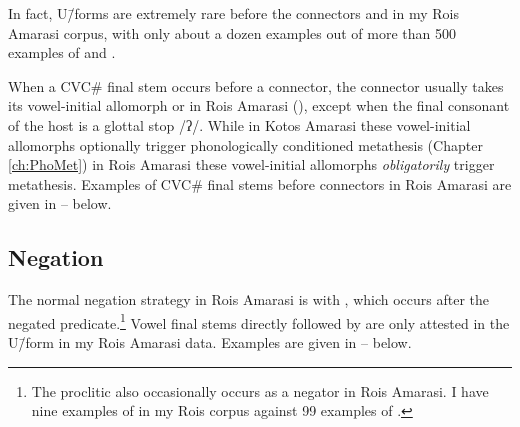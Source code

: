 In fact, U\=/forms are extremely rare before the connectors
 and  in my Ro{\Q}is Amarasi corpus,
with only about a dozen examples out of more than 500 examples
of  and .

When a CVC{\#} final stem occurs before a connector,
the connector usually takes its vowel-initial
allomorph  or  in Ro{\Q}is Amarasi (),
except when the final consonant of the host is a glottal stop /ʔ/.
While in Kotos Amarasi these vowel-initial allomorphs optionally
trigger phonologically conditioned metathesis (Chapter \ref{ch:PhoMet})
in Ro{\Q}is Amarasi these vowel-initial allomorphs \emph{obligatorily} trigger metathesis.
Examples of CVC{\#} final stems before connectors in Ro{\Q}is Amarasi
are given in -- below.

\begin{exe}
	\label{ex:RO-170830-4, 7.15}
	\label{ex:RO-170902-1, 2.04}
	\label{ex:RO-170829-1, 13.10}
\end{exe}

\subsection{Negation}\label{sec:RoqNeg}
The normal negation strategy in Ro{\Q}is Amarasi
is with , which occurs after the negated predicate.\footnote{
		The proclitic  also occasionally occurs as a negator
		in Ro{\Q}is Amarasi. I have nine examples of 
		in my Ro{\Q}is corpus against 99 examples of .}
Vowel final stems directly followed by 
are only attested in the U\=/form in my Ro{\Q}is Amarasi data.
Examples are given in -- below.

